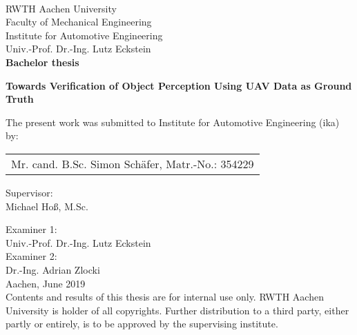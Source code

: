 \newcommand*{\getSubmissionDate}{June 2019}
\newcommand*{\getSubmissionLocation}{Aachen}
\begin{titlepage}
  \centering
  ~

  \vspace{0mm}
  {\Large RWTH Aachen University\\ Faculty of Mechanical Engineering}\\

  \vspace{8mm}
  {\Large Institute for Automotive Engineering}\\{Univ.-Prof. Dr.-Ing. Lutz Eckstein}\\

  \vspace{20mm}
  {\large \textbf{Bachelor thesis}}

  \vspace{5mm}
  {\huge\bfseries Towards Verification of Object Perception Using UAV Data as Ground Truth}

  \vspace{20mm}
  {The present work was submitted to Institute for Automotive Engineering (ika)\\by:}

  \vspace{3mm}
  \begin{tabular}{c}
    Mr. cand. B.Sc. Simon Sch\"afer, Matr.-No.: 354229
  \end{tabular}

  \vspace{10mm}
  {Supervisor:}\\
  \vspace{3mm}
  {Michael Ho\ss, M.Sc.}

  \vspace{15mm}
  {Examiner 1:}\\
  {Univ.-Prof. Dr.-Ing. Lutz Eckstein}\\
  \vspace{4mm}
  {Examiner 2:}\\
  {Dr.-Ing. Adrian Zlocki}\\

  \vspace{13mm}
  {\getSubmissionLocation{}, \getSubmissionDate{}}\\
  \vspace{4mm}
  {Contents and results of this thesis are for internal use only. RWTH Aachen University is holder of all copyrights. Further distribution to a third party, either partly or entirely, is to be approved by the supervising institute.}
\end{titlepage}
\restoregeometry
